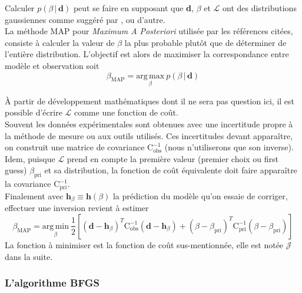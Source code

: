 \documentclass[a4paper,12pt]{article}
\newcommand{\bepar}[1]{
	\left( #1 \right)  
}
\newcommand{\becro}[1]{
	\left[ #1 \right]  
}
\newcommand{\covobs}{\text{C}^{-1}_{\text{obs}}}
\newcommand{\covpri}{\text{C}^{-1}_{\text{pri}}}
\newcommand{\bmap}{\beta_{\text{MAP}}}
\newcommand\bk{\color{black}}
\newcommand\dsb{\color{dsb}}
\numberwithin{equation}{section} %
\begin{document}
Calculer $p\bepar{\beta\,|\,\textbf{d}}$ peut se faire en supposant que \textbf{d}, $\beta$ et $\mathcal{L}$ ont des distributions gaussiennes comme suggéré par \citep{parish2016paradigm}, \citep{tarantola2005inverse} ou d'autre.\\
La méthode MAP pour \textit{Maximum A Posteriori} utilisée par les références citées, consiste à calculer la valeur de $\beta$ la plus probable plutôt que de déterminer de l'entière distribution. L'objectif est alors de maximiser la correspondance entre modèle et observation soit 
\begin{equation}
\beta_{\text{MAP}} = \underset{\beta}{\text{arg}\, \text{max}} \ p\bepar{\beta\,|\,\textbf{d}} \label{bmap}
\end{equation}

\noindent À partir de développement mathématiques dont il ne sera pas question ici, il est possible d'écrire $\mathcal{L}$ comme une fonction de coût.\\
Souvent les données expérimentales sont obtenues avec une incertitude propre à la méthode de mesure ou aux outils utilisés. Ces incertitudes devant apparaître, on construit une matrice de covariance $\covobs$ (nous n'utiliserons que son inverse). \\
Idem, puisque $\mathcal{L}$ prend en compte la première valeur (premier choix ou first guess) $\beta_{\text{pri}}$ et sa distribution, la fonction de coût équivalente doit faire apparaître la covariance $\covpri$.\\
Finalement avec $\textbf{h}_\beta \equiv \textbf{h}(\beta)$ la prédiction du modèle qu'on essaie de corriger, effectuer une inversion revient à estimer 
\begin{equation}
\bmap = \underset{\beta}{\text{arg}\, \text{min}}\ \frac{1}{2}\becro{\bepar{\textbf{d} - \textbf{h}_\beta}^T \covobs \bepar{\textbf{d} - \textbf{h}_\beta} + \bepar{\beta - \beta_{\text{pri}}}^T \covpri  \bepar{\beta - \beta_{\text{pri}}}} \label{bmapJ}
\end{equation}
La fonction à minimiser est la fonction de coût sus-mentionnée, elle est notée $\mathcal{J}$ dans la suite.

\dsb \subsubsection{L'algorithme BFGS} \bk
\end{document}

